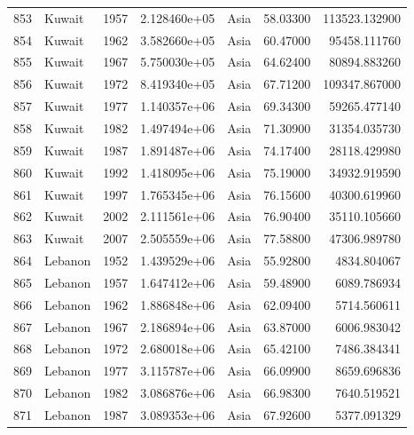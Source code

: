 \documentclass[
  letterpaper,
  DIV=11,
  numbers=noendperiod]{scrreprt}
\begin{document}
\begin{tabular}{llrrlrr}
853  &                    Kuwait &  1957 &  2.128460e+05 &      Asia &  58.03300 &  113523.132900 \\
854  &                    Kuwait &  1962 &  3.582660e+05 &      Asia &  60.47000 &   95458.111760 \\
855  &                    Kuwait &  1967 &  5.750030e+05 &      Asia &  64.62400 &   80894.883260 \\
856  &                    Kuwait &  1972 &  8.419340e+05 &      Asia &  67.71200 &  109347.867000 \\
857  &                    Kuwait &  1977 &  1.140357e+06 &      Asia &  69.34300 &   59265.477140 \\
858  &                    Kuwait &  1982 &  1.497494e+06 &      Asia &  71.30900 &   31354.035730 \\
859  &                    Kuwait &  1987 &  1.891487e+06 &      Asia &  74.17400 &   28118.429980 \\
860  &                    Kuwait &  1992 &  1.418095e+06 &      Asia &  75.19000 &   34932.919590 \\
861  &                    Kuwait &  1997 &  1.765345e+06 &      Asia &  76.15600 &   40300.619960 \\
862  &                    Kuwait &  2002 &  2.111561e+06 &      Asia &  76.90400 &   35110.105660 \\
863  &                    Kuwait &  2007 &  2.505559e+06 &      Asia &  77.58800 &   47306.989780 \\
864  &                   Lebanon &  1952 &  1.439529e+06 &      Asia &  55.92800 &    4834.804067 \\
865  &                   Lebanon &  1957 &  1.647412e+06 &      Asia &  59.48900 &    6089.786934 \\
866  &                   Lebanon &  1962 &  1.886848e+06 &      Asia &  62.09400 &    5714.560611 \\
867  &                   Lebanon &  1967 &  2.186894e+06 &      Asia &  63.87000 &    6006.983042 \\
868  &                   Lebanon &  1972 &  2.680018e+06 &      Asia &  65.42100 &    7486.384341 \\
869  &                   Lebanon &  1977 &  3.115787e+06 &      Asia &  66.09900 &    8659.696836 \\
870  &                   Lebanon &  1982 &  3.086876e+06 &      Asia &  66.98300 &    7640.519521 \\
871  &                   Lebanon &  1987 &  3.089353e+06 &      Asia &  67.92600 &    5377.091329 \\

\end{tabular}
\end{document}
